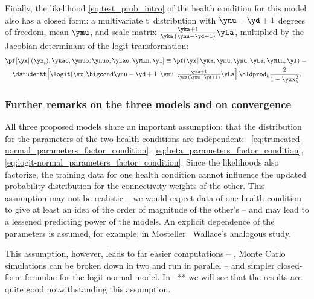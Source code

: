 

Finally, the likelihood \eqref{eq:test_prob_intro} of the health condition
for this model also has a closed form: a multivariate t~distribution
\citep{kotzetal2004,minka1998_r2001,murphy2007} with $\ynu-\yd+1$ degrees
of freedom, mean $\ymu$, and scale matrix
$\frac{\yka+1}{\yka\,(\ynu-\yd+1)}\yLa$, multiplied by the Jacobian
determinant of the logit transformation:
\begin{multline}
  \label{eq:predictive_distribution}
  \pf[\yx \| (\yx_i),\ykao,\ymuo,\ynuo,\yLao,\yMln, \yI] \equiv
  \pf(\yx \| \yka,\ymu,\ynu,\yLa,\yMln, \yI) ={}\\
  \dstudentt\Bigl[\logit(\yx) \bigcond \ynu-\yd+1, \ymu,
  \tfrac{\yka+1}{\yka\,(\ynu-\yd+1)}\yLa \Bigr]
  \,\oldprod_k\frac{2}{1-\yxx_k^2}.
\end{multline}



\bigskip

\subsubsection{Further remarks on the three models and on convergence}
\label{sec:remarks_models}

All three proposed models share an important assumption: that the distribution
for the parameters of the two health conditions are independent:
\eqns~\eqref{eq:truncated-normal_parameters_factor_condition},
\eqref{eq:beta_parameters_factor_condition},
\eqref{eq:logit-normal_parameters_factor_condition}. Since the likelihoods
also factorize, the training data for one health condition cannot influence
the updated probability distribution for the connectivity weights of the other.
This assumption may not be realistic -- we would expect data of one health
condition to give at least an idea of the order of magnitude of the other's
-- and may lead to a lessened predicting power of the models. An explicit
dependence of the parameters is assumed, for example, in Mosteller \amp\
Wallace's \citep{mostelleretal1963} analogous study.

This assumption, however, leads to far easier computations -- \eg, Monte
Carlo simulations can be broken down in two and run in parallel -- and
simpler closed-form formulae for the logit-normal model. In \sect~** we
will see that the results are quite good notwithstanding this assumption.

